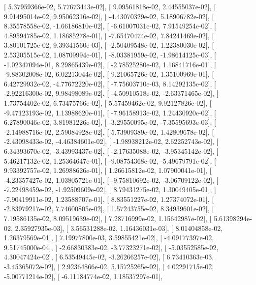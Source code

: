 \documentclass{article}
\begin{document}
       [  5.37959366e-02,   5.77673443e-02],
       [  9.09561818e-02,   2.44555037e-02],
       [  9.91495014e-02,   9.95062316e-02],
       [ -4.43070329e-02,   5.18906782e-02],
       [  8.35578558e-02,  -1.66186810e-02],
       [ -6.61007031e-02,   7.91549254e-02],
       [  4.89594785e-02,   1.18685278e-01],
       [ -7.65470474e-02,   7.84241469e-02],
       [  3.80101725e-02,   9.39341560e-03],
       [ -2.50409548e-02,   1.22380030e-02],
       [  2.53205515e-02,   1.08709994e-01],
       [ -8.03381959e-02,  -1.98614125e-03],
       [ -1.02347094e-01,   8.29865439e-02],
       [ -2.78525280e-02,   1.16841716e-01],
       [ -9.88302008e-02,   6.02213044e-02],
       [  9.21065726e-02,   1.35100969e-01],
       [  6.42729932e-02,  -4.77672220e-02],
       [ -7.75603710e-03,   8.14292135e-02],
       [ -2.92216300e-02,   9.98498089e-02],
       [ -4.50910518e-02,  -2.63371465e-02],
       [  1.73754402e-02,   6.73475766e-02],
       [  5.57459462e-02,   9.92127826e-02],
       [ -9.47123193e-02,   1.13988620e-01],
       [ -7.96158913e-02,   1.24430920e-02],
       [  6.27890046e-02,   3.81981226e-02],
       [ -3.29550095e-02,  -7.35595693e-03],
       [ -2.14988716e-02,   2.59084928e-02],
       [  5.73909389e-02,   1.42809678e-02],
       [ -2.43098433e-02,  -4.46384601e-02],
       [ -1.98938212e-02,   2.62252743e-02],
       [  6.34393670e-02,  -3.43993437e-02],
       [ -2.17635088e-02,  -3.95345142e-02],
       [  5.46217132e-02,   1.25364647e-01],
       [ -9.08754368e-02,  -5.49679791e-02],
       [  9.93392757e-02,   1.26988626e-01],
       [  1.26615812e-02,   1.07900041e-01],
       [ -4.23357427e-02,   1.03805721e-01],
       [ -9.75810692e-02,  -3.06709122e-02],
       [ -7.22498459e-02,  -1.92509609e-02],
       [  8.79431275e-02,   1.30049405e-01],
       [ -7.90419911e-02,   1.23588707e-01],
       [  8.83551227e-02,   1.27374072e-01],
       [ -2.83979217e-02,   7.74600805e-02],
       [  1.57243755e-02,   8.34939601e-02],
       [  7.19586135e-02,   8.09519639e-02],
       [  7.28716999e-02,   1.15642987e-02],
       [  5.61398294e-02,   2.35927935e-03],
       [  3.56531288e-02,   1.16436031e-03],
       [  8.01404858e-02,   1.26379569e-01],
       [  7.19977800e-03,   3.59855421e-02],
       [ -4.09177397e-02,   9.51745000e-04],
       [ -2.66830383e-02,  -3.77323271e-02],
       [ -5.03552585e-02,   4.30047424e-02],
       [  6.53549445e-02,  -3.26266257e-02],
       [  6.73410363e-03,  -3.45365072e-02],
       [  2.92364866e-02,   5.15725265e-02],
       [  4.02291715e-02,  -5.00771214e-02],
       [ -6.11184774e-02,   1.18537297e-01],
\end{document}
